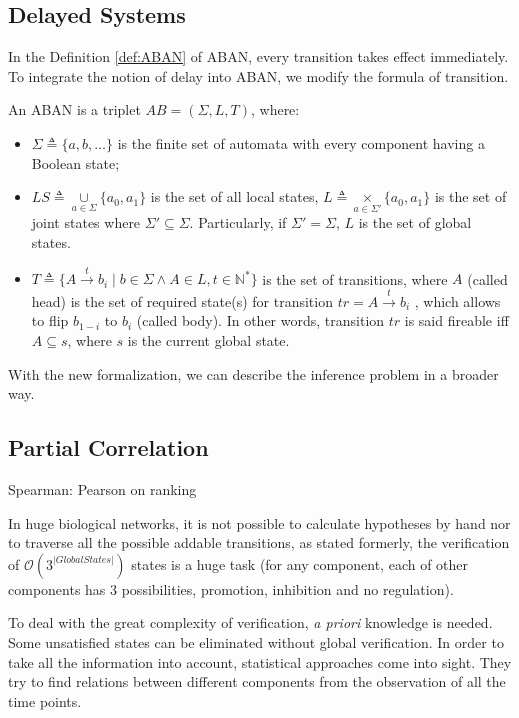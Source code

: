 \subsection{Delayed Systems}
In the Definition \ref{def:ABAN} of ABAN, every transition takes effect immediately.
To integrate the notion of delay into ABAN, we modify the formula of transition.

\begin{definition}
An ABAN is a triplet $AB = (\Sigma,L,T)$, where:
\begin{itemize}
\item $\Sigma\triangleq\{a,b,\ldots\}$ is the finite set of automata with every component having a Boolean state;
\item $LS\triangleq \underset{a\in \Sigma}{\cup} \{a_0,a_1\}$ is the set of all local states, $L\triangleq \underset{a\in \Sigma'}{\times} \{a_0,a_1\}$ is the set of joint states where $\Sigma'\subseteq\Sigma$. Particularly, if $\Sigma'=\Sigma$, $L$ is the set of global states. 
\item $T\triangleq \{A\xrightarrow{t} b_i\mid b\in \Sigma \land A\in L, t\in \mathbb{N}^*\}$ is the set of transitions, where $A$ (called head) is the set of required state(s) for transition $tr=A\xrightarrow{t} b_i$ , which allows to flip $b_{1-i}$ to $b_i$ (called body). In other words, transition $tr$ is said fireable iff $A\subseteq s$, where $s$ is the current global state.
\end{itemize}
\end{definition}
With the new formalization, we can describe the inference problem in a broader way.

\subsection{Partial Correlation}
Spearman: Pearson on ranking

In huge biological networks, it is not possible to calculate hypotheses by hand nor to traverse all the possible addable transitions, as stated formerly, the verification of $\mathcal{O}(3^{|Global States|})$ states is a huge task (for any component, each of other components has 3 possibilities, promotion, inhibition and no regulation).
 
To deal with the great complexity of verification, \textit{a priori} knowledge is needed. 
Some unsatisfied states can be eliminated without global verification.  
In order to take all the information into account, statistical approaches come into sight.
They try to find relations between different components from the observation of all the time points.

